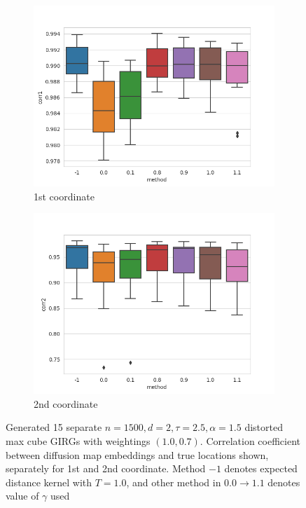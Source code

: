\begin{figure}
  \centering
  \begin{subfigure}{0.49\textwidth}
    \centering
    \includegraphics[width=\linewidth]{figures/diffmap_corr1.png}
    \caption{1st coordinate}
  \end{subfigure}
  \hfill
  \begin{subfigure}{0.49\textwidth}
    \centering
    \includegraphics[width=\linewidth]{figures/diffmap_corr2.png}
    \caption{2nd coordinate}
  \end{subfigure}

  \caption{Generated 15 separate $n=1500, d=2, \tau=2.5, \alpha=1.5$ distorted max cube GIRGs with weightings $(1.0, 0.7)$. Correlation coefficient between diffusion map embeddings and true locations shown, separately for 1st and 2nd coordinate. Method $-1$ denotes expected distance kernel with $T=1.0$, and other method in $0.0 \to 1.1$ denotes value of $\gamma$ used}
  \label{fig:diffmap_corr_comparisons}
\end{figure}


